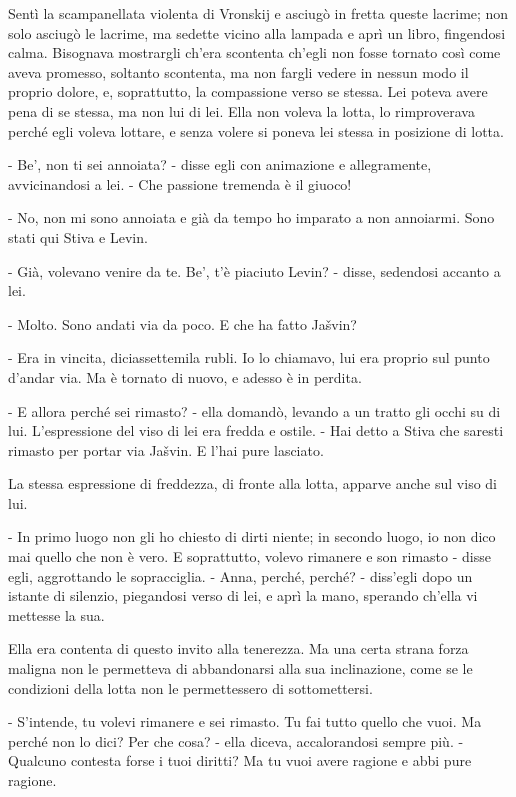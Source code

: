 Sentì la scampanellata violenta di Vronskij e asciugò in fretta queste lacrime; non solo asciugò le lacrime, ma sedette vicino alla lampada e aprì un libro, fingendosi calma. Bisognava mostrargli ch'era scontenta ch'egli non fosse tornato così come aveva promesso, soltanto scontenta, ma non fargli vedere in nessun modo il proprio dolore, e, soprattutto, la compassione verso se stessa. Lei poteva avere pena di se stessa, ma non lui di lei. Ella non voleva la lotta, lo rimproverava perché egli voleva lottare, e senza volere si poneva lei stessa in posizione di lotta. 

- Be', non ti sei annoiata? - disse egli con animazione e allegramente, avvicinandosi a lei. - Che passione tremenda è il giuoco! 

- No, non mi sono annoiata e già da tempo ho imparato a non annoiarmi. Sono stati qui Stiva e Levin. 

- Già, volevano venire da te. Be', t'è piaciuto Levin? - disse, sedendosi accanto a lei. 

- Molto. Sono andati via da poco. E che ha fatto Jašvin? 

- Era in vincita, diciassettemila rubli. Io lo chiamavo, lui era proprio sul punto d'andar via. Ma è tornato di nuovo, e adesso è in perdita. 

- E allora perché sei rimasto? - ella domandò, levando a un tratto gli occhi su di lui. L'espressione del viso di lei era fredda e ostile. - Hai detto a Stiva che saresti rimasto per portar via Jašvin. E l'hai pure lasciato. 

La stessa espressione di freddezza, di fronte alla lotta, apparve anche sul viso di lui. 

- In primo luogo non gli ho chiesto di dirti niente; in secondo luogo, io non dico mai quello che non è vero. E soprattutto, volevo rimanere e son rimasto - disse egli, aggrottando le sopracciglia. - Anna, perché, perché? - diss'egli dopo un istante di silenzio, piegandosi verso di lei, e aprì la mano, sperando ch'ella vi mettesse la sua. 

Ella era contenta di questo invito alla tenerezza. Ma una certa strana forza maligna non le permetteva di abbandonarsi alla sua inclinazione, come se le condizioni della lotta non le permettessero di sottomettersi. 

- S'intende, tu volevi rimanere e sei rimasto. Tu fai tutto quello che vuoi. Ma perché non lo dici? Per che cosa? - ella diceva, accalorandosi sempre più. - Qualcuno contesta forse i tuoi diritti? Ma tu vuoi avere ragione e abbi pure ragione. 


